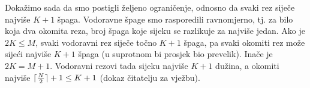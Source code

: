 Dokažimo sada da smo postigli željeno ograničenje, odnosno da svaki rez siječe
najviše $K + 1$ špaga. Vodoravne špage smo rasporedili ravnomjerno, tj. za bilo
koja dva okomita reza, broj špaga koje sijeku se razlikuje za najviše jedan.
Ako je $2K \leq M$, svaki vodoravni rez siječe točno $K + 1$ špaga, pa svaki
okomiti rez može sijeći najviše $K + 1$ špaga (u suprotnom bi prosjek bio
prevelik). Inače je $2K = M + 1$. Vodoravni rezovi tada sijeku najviše $K + 1$
dužina, a okomiti najviše $\lceil\frac{N}{2}\rceil + 1 \leq K + 1$ (dokaz čitatelju
za vježbu).
